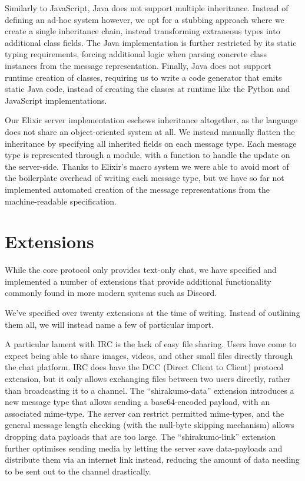 \documentclass[format=sigconf]{acmart}
\begin{document}
Similarly to JavaScript, Java does not support multiple inheritance. Instead of defining an ad-hoc system however, we opt for a stubbing approach where we create a single inheritance chain, instead transforming extraneous types into additional class fields. The Java implementation is further restricted by its static typing requirements, forcing additional logic when parsing concrete class instances from the message representation. Finally, Java does not support runtime creation of classes, requiring us to write a code generator that emits static Java code, instead of creating the classes at runtime like the Python and JavaScript implementations.

Our Elixir server implementation eschews inheritance altogether, as the language does not share an object-oriented system at all. We instead manually flatten the inheritance by specifying all inherited fields on each message type. Each message type is represented through a module, with a function to handle the update on the server-side. Thanks to Elixir's macro system we were able to avoid most of the boilerplate overhead of writing each message type, but we have so far not implemented automated creation of the message representations from the machine-readable specification.

\section{Extensions}\label{extensions}
While the core protocol only provides text-only chat, we have specified and implemented a number of extensions that provide additional functionality commonly found in more modern systems such as Discord.

We've specified over twenty extensions at the time of writing. Instead of outlining them all, we will instead name a few of particular import.

A particular lament with IRC is the lack of easy file sharing. Users have come to expect being able to share images, videos, and other small files directly through the chat platform. IRC does have the DCC (Direct Client to Client) protocol extension, but it only allows exchanging files between two users directly, rather than broadcasting it to a channel. The ``shirakumo-data'' extension introduces a new message type that allows sending a base64-encoded payload, with an associated mime-type. The server can restrict permitted mime-types, and the general message length checking (with the null-byte skipping mechanism) allows dropping data payloads that are too large. The ``shirakumo-link'' extension further optimises sending media by letting the server save data-payloads and distribute them via an internet link instead, reducing the amount of data needing to be sent out to the channel drastically.
\end{document}
